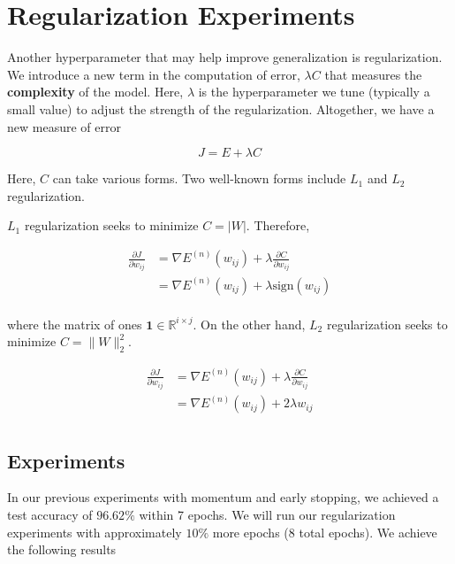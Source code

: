 \section{Regularization Experiments}

Another hyperparameter that may help improve generalization is
regularization. We introduce a new term in the computation of error, $\lambda C$
that measures the \textbf{complexity} of the model. Here, $\lambda$ is the
hyperparameter we tune (typically a small value) to adjust the
strength of the regularization. Altogether, we have a new measure of error

\begin{equation*}
	J = E + \lambda C
\end{equation*}

Here, $C$ can take various forms. Two well-known forms include $L_1$ and $L_2$
regularization.

$L_1$ regularization seeks to minimize $C = |W|$. Therefore,

\begin{equation*}
	\begin{aligned}
		\frac{\partial J}{\partial w_{ij}} & = \nabla E^{(n)}(w_{ij}) + \lambda
		\frac{\partial C}{\partial w_{ij}}                                      \\
		                                   & = \nabla E^{(n)}(w_{ij}) + \lambda
		\text{sign}  (w_{ij})                                                   \\
	\end{aligned}
  \label{eq:l1_l2}
\end{equation*}

where the matrix of ones $\mathbf{1} \in \mathbb{R}^{i \times j}$. On the other
hand, $L_2$ regularization seeks to minimize $C = \| W \|^2_2$.

\begin{equation}
	\begin{aligned}
		\frac{\partial J}{\partial w_{ij}} & = \nabla E^{(n)}(w_{ij}) + \lambda
		\frac{\partial C}{\partial w_{ij}}                                        \\
		                                   & = \nabla E^{(n)}(w_{ij}) + 2 \lambda
		w_{ij}                                                                    \\
	\end{aligned}
\end{equation}

\subsection{Experiments}
In our previous experiments with momentum and early stopping, we achieved a test
accuracy of $96.62\%$ within 7 epochs. We will run our regularization
experiments with approximately $10\%$ more epochs (8 total epochs). We achieve
the following results

